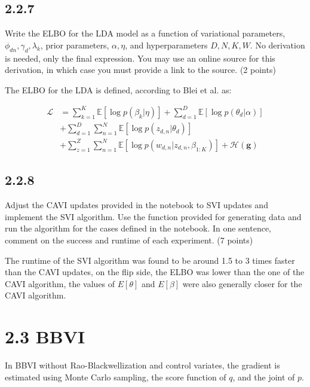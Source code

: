 \documentclass{article}
\begin{document}
\begin{multicols}{2}
\subsection*{2.2.7}
Write the ELBO for the LDA model as a function of variational parameters, \(\phi_{dn}, \gamma_d, \lambda_k\), prior parameters, \(\alpha, \eta\), and hyperparameters \(D, N, K, W\). No derivation is needed, only the final expression. You may use an online source for this derivation, in which case you must provide a link to the source. (2 points)\bigskip

The ELBO for the LDA is defined, according to Blei et al. \cite{blei2009visualizing} as:

\begin{equation}
    \begin{aligned}
        \mathcal{L} &= \sum_{k=1}^{K} \mathbb{E}[\log p(\beta_k | \eta)]+\sum_{d=1}^{D} \mathbb{E}[\log p(\theta_d | \alpha)] \\
        &+ \sum_{d=1}^{D} \sum_{n=1}^{N} \mathbb{E}[\log p(z_{d,n} | \theta_d)] \\
        &+ \sum_{z=1}^{Z} \sum_{n=1}^{N} \mathbb{E}[\log p(w_{d,n} | z_{d,n}, \beta_{1:K})] + \mathcal{H}(\mathbf{g})
    \end{aligned}
\end{equation}

\subsection*{2.2.8}
Adjust the CAVI updates provided in the notebook to SVI updates and implement the SVI algorithm. Use the function provided for generating data and run the algorithm for the cases defined in the notebook. In one sentence, comment on the success and runtime of each experiment. (7 points)\bigskip

The runtime of the SVI algorithm was found to be around 1.5 to 3 times faster than the CAVI updates, on the flip side, the ELBO was lower
than the one of the CAVI algorithm, the values of $E[\theta]$ and $E[\beta]$ were also generally closer for the CAVI algorithm.    


\section*{2.3 BBVI}
    In BBVI without Rao-Blackwellization and control variates, the gradient is estimated using Monte Carlo sampling, the score function of \(q\), and the joint of \(p\).


\end{multicols}
\end{document}
